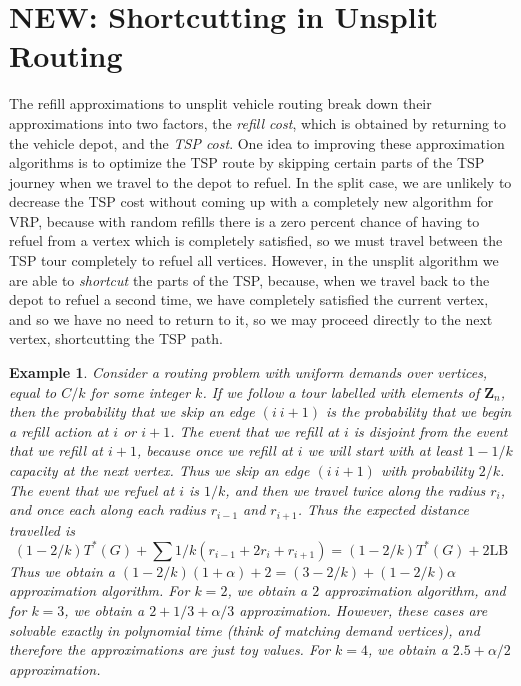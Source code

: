 \documentclass{article}
\theoremstyle{plain}
\newtheorem*{example}{Example}
\theoremstyle{plain}
\begin{document}
\section{NEW: Shortcutting in Unsplit Routing}

The refill approximations to unsplit vehicle routing break down their approximations into two factors, the {\it refill cost}, which is obtained by returning to the vehicle depot, and the {\it TSP cost}. One idea to improving these approximation algorithms is to optimize the TSP route by skipping certain parts of the TSP journey when we travel to the depot to refuel. In the split case, we are unlikely to decrease the TSP cost without coming up with a completely new algorithm for VRP, because with random refills there is a zero percent chance of having to refuel from a vertex which is completely satisfied, so we must travel between the TSP tour completely to refuel all vertices. However, in the unsplit algorithm we are able to {\it shortcut} the parts of the TSP, because, when we travel back to the depot to refuel a second time, we have completely satisfied the current vertex, and so we have no need to return to it, so we may proceed directly to the next vertex, shortcutting the TSP path.

\begin{example}
    Consider a routing problem with uniform demands over vertices, equal to $C/k$ for some integer $k$. If we follow a tour labelled with elements of $\mathbf{Z}_n$, then the probability that we skip an edge $(i\ i+1)$ is the probability that we begin a refill action at $i$ or $i+1$. The event that we refill at $i$ is disjoint from the event that we refill at $i+1$, because once we refill at $i$ we will start with at least $1-1/k$ capacity at the next vertex. Thus we skip an edge $(i\ i+1)$ with probability $2/k$. The event that we refuel at $i$ is $1/k$, and then we travel twice along the radius $r_i$, and once each along each radius $r_{i-1}$ and $r_{i+1}$. Thus the expected distance travelled is
    \[ (1 - 2/k) T^*(G) + \sum 1/k (r_{i-1} + 2r_i + r_{i+1}) = (1 - 2/k) T^*(G) + 2 \text{LB} \]
    Thus we obtain a $(1 - 2/k)(1 + \alpha) + 2 = (3 - 2/k) + (1-2/k) \alpha$ approximation algorithm. For $k = 2$, we obtain a $2$ approximation algorithm, and for $k = 3$, we obtain a $2 + 1/3 + \alpha/3$ approximation. However, these cases are solvable exactly in polynomial time (think of matching demand vertices), and therefore the approximations are just toy values. For $k = 4$, we obtain a $2.5 + \alpha/2$ approximation.
\end{example}
\end{document}
